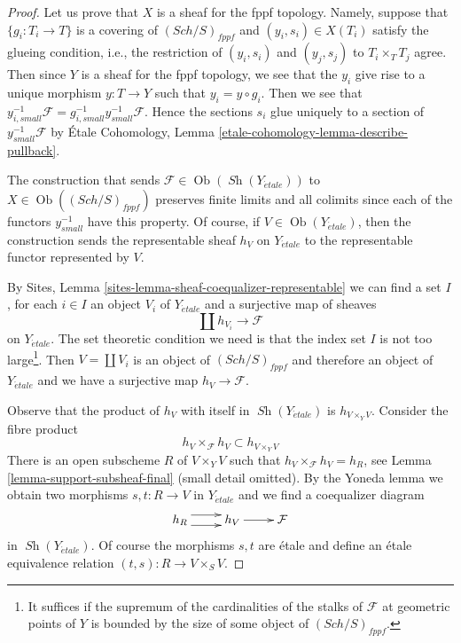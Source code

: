\documentclass{stacks-project}
\theoremstyle{plain}
\theoremstyle{definition}
\theoremstyle{remark}
\numberwithin{equation}{subsection}
\def\Sch{\mathit{Sch}}
\def\Ob{\mathop{\mathrm{Ob}}\nolimits}
\def\Sh{\mathop{\mathit{Sh}}\nolimits}
\def\etale{{\acute{e}tale}}
\begin{document}
\begin{proof}
Let us prove that $X$ is a sheaf for the fppf topology. Namely, suppose
that $\{g_i : T_i \to T\}$ is a covering of $(\Sch/S)_{fppf}$ and
$(y_i, s_i) \in X(T_i)$ satisfy the glueing condition, i.e., the
restriction of $(y_i, s_i)$ and $(y_j, s_j)$ to $T_i \times_T T_j$ agree.
Then since $Y$ is a sheaf for the fppf topology, we see that
the $y_i$ give rise to a unique morphism $y : T \to Y$ such that
$y_i = y \circ g_i$. Then we see that
$y_{i, small}^{-1}\mathcal{F} = g_{i, small}^{-1}y_{small}^{-1}\mathcal{F}$.
Hence the sections $s_i$ glue uniquely to a section of
$y_{small}^{-1}\mathcal{F}$ by
\'Etale Cohomology, Lemma \ref{etale-cohomology-lemma-describe-pullback}.

\medskip\noindent
The construction that sends $\mathcal{F} \in \Ob(\Sh(Y_\etale))$
to $X \in \Ob((\Sch/S)_{fppf})$ preserves finite limits and
all colimits since each of the functors $y_{small}^{-1}$ have
this property. Of course, if $V \in \Ob(Y_\etale)$, then
the construction sends the representable sheaf $h_V$ on $Y_\etale$
to the representable functor represented by $V$.

\medskip\noindent
By Sites, Lemma \ref{sites-lemma-sheaf-coequalizer-representable}
we can find a set $I$, for each $i \in I$ an object $V_i$ of $Y_\etale$
and a surjective map of sheaves
$$
\coprod h_{V_i} \longrightarrow \mathcal{F}
$$
on $Y_\etale$. The set theoretic condition we need is that the index
set $I$ is not too large\footnote{It suffices if the supremum of the
cardinalities of the stalks of $\mathcal{F}$ at geometric points of $Y$
is bounded by the size of some object of $(\Sch/S)_{fppf}$.}.
Then $V = \coprod V_i$ is an object of $(\Sch/S)_{fppf}$ and
therefore an object of $Y_\etale$ and we have a surjective map
$h_V \to \mathcal{F}$.

\medskip\noindent
Observe that the product of $h_V$ with itself in $\Sh(Y_\etale)$
is $h_{V \times_Y V}$. Consider the fibre product
$$
h_V \times_\mathcal{F} h_V \subset h_{V \times_Y V}
$$
There is an open subscheme $R$ of $V \times_Y V$ such that
$h_V \times_\mathcal{F} h_V = h_R$, see
Lemma \ref{lemma-support-subsheaf-final} (small detail omitted).
By the Yoneda lemma we obtain two morphisms $s, t : R \to V$ in $Y_\etale$
and we find a coequalizer diagram
$$
\xymatrix{
h_R \ar@<1ex>[r] \ar@<-1ex>[r] &
h_V \ar[r] &
\mathcal{F}
}
$$
in $\Sh(Y_\etale)$. Of course the morphisms $s, t$ are \'etale
and define an \'etale equivalence relation $(t, s) : R \to V \times_S V$.


\end{proof}
\end{document}
